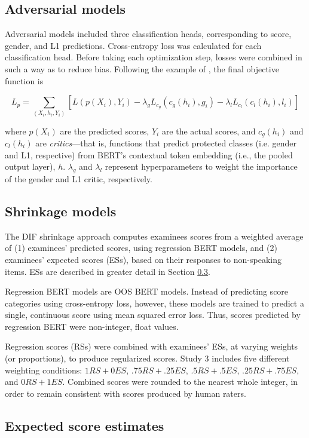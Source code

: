 \documentclass [PhD] {uclathes}
\begin{document}
\subsection{Adversarial models}

Adversarial models included three classification heads, corresponding to score, gender, and L1 predictions. Cross-entropy loss was calculated for each classification head. Before taking each optimization step, losses were combined in such a way as to reduce bias. Following the example of \citet{wang2019balanced}, the final objective function is

$$
L_p = \sum_{(X_i, h_i, Y_i)} [L(p(X_i), Y_i) - \lambda_g L_{c_g}(c_g(h_i), g_i) - \lambda_l L_{c_l}(c_l(h_i), l_i)]
$$

where $p(X_i)$ are the predicted scores, $Y_i$ are the actual scores, and $c_g(h_i)$ and $c_l(h_i)$ are \emph{critics}---that is, functions that predict protected classes (i.e. gender and L1, respective) from BERT’s contextual token embedding (i.e., the pooled output layer), $h$. $\lambda_g$ and $\lambda_l$ represent hyperparameters to weight the importance of the gender and L1 critic, respectively. 

\subsection{Shrinkage models}

The DIF shrinkage approach computes examinees scores from a weighted average of (1) examinees’ predicted scores, using regression BERT models, and (2) examinees’ expected scores (ESs), based on their responses to non-speaking items. ESs are described in greater detail in Section \ref{sec:meth_es}. 

Regression BERT models are OOS BERT models. Instead of predicting score categories using cross-entropy loss, however, these models are trained to predict a single, continuous score using mean squared error loss. Thus, scores predicted by regression BERT were non-integer, float values. 

Regression scores (RSs) were combined with examinees’ ESs, at varying weights (or proportions), to produce regularized scores. Study 3 includes five different weighting conditions: $1 RS + 0 ES$, $.75 RS + .25 ES$, $.5 RS + .5 ES$, $.25 RS + .75 ES$, and $0 RS + 1 ES$. Combined scores were rounded to the nearest whole integer, in order to remain consistent with scores produced by human raters. 

\subsection{Expected score estimates}
\label{sec:meth_es}
\end{document}
